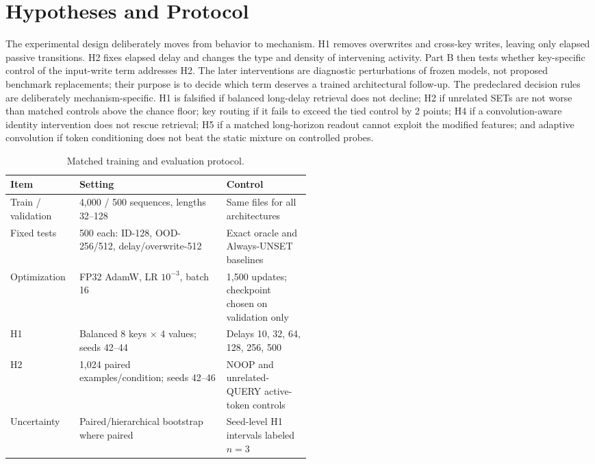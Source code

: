 \documentclass[10pt,a4paper]{article}
\begin{document}
\section{Hypotheses and Protocol}
The experimental design deliberately moves from behavior to mechanism. H1 removes overwrites and cross-key writes, leaving only elapsed passive transitions. H2 fixes elapsed delay and changes the type and density of intervening activity. Part B then tests whether key-specific control of the input-write term addresses H2. The later interventions are diagnostic perturbations of frozen models, not proposed benchmark replacements; their purpose is to decide which term deserves a trained architectural follow-up.
The predeclared decision rules are deliberately mechanism-specific. H1 is falsified if balanced long-delay retrieval does not decline; H2 if unrelated SETs are not worse than matched controls above the chance floor; key routing if it fails to exceed the tied control by 2 points; H4 if a convolution-aware identity intervention does not rescue retrieval; H5 if a matched long-horizon readout cannot exploit the modified features; and adaptive convolution if token conditioning does not beat the static mixture on controlled probes.

\addtocounter{table}{1}%
\begin{table}[!htbp]
\centering\small
\caption{Matched training and evaluation protocol.}
\begin{tabularx}{\linewidth}{p{0.23\linewidth}Y p{0.28\linewidth}}
\toprule
Item & Setting & Control \\
\midrule
Train / validation & 4,000 / 500 sequences, lengths 32--128 & Same files for all architectures \\
Fixed tests & 500 each: ID-128, OOD-256/512, delay/overwrite-512 & Exact oracle and Always-UNSET baselines \\
Optimization & FP32 AdamW, LR \(10^{-3}\), batch 16 & 1,500 updates; checkpoint chosen on validation only \\
H1 & Balanced 8 keys \(\times\) 4 values; seeds 42--44 & Delays 10, 32, 64, 128, 256, 500 \\
H2 & 1,024 paired examples/condition; seeds 42--46 & NOOP and unrelated-QUERY active-token controls \\
Uncertainty & Paired/hierarchical bootstrap where paired & Seed-level H1 intervals labeled \(n=3\) \\
\bottomrule
\end{tabularx}
\end{table}
\end{document}
